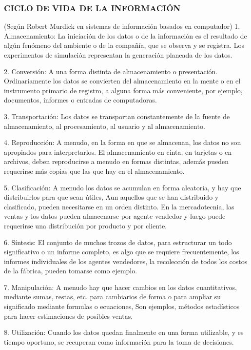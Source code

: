 \subsubsection*{CICLO DE VIDA DE LA INFORMACIÓN}
(Según Robert Murdick en sistemas de información basados en computador) 1. Almacenamiento: La iniciación de los datos o de la información es el resultado de algún fenómeno del ambiente o de la compañía, que se observa y se registra. Los experimentos de simulación representan la generación planeada de los datos.

2. Conversión: A una forma distinta de almacenamiento o presentación. Ordinariamente los datos se convierten del almacenamiento en la mente o en el instrumento primario de registro, a alguna forma más conveniente, por ejemplo, documentos, informes o entradas de computadoras.

3. Transportación: Los datos se transportan constantemente de la fuente de almacenamiento, al procesamiento, al usuario y al almacenamiento.

4. Reproducción: A menudo, en la forma en que se almacenan, los datos no son apropiados para interpretarlos. El almacenamiento en cinta, en tarjetas o en archivos, deben reproducirse a menudo en formas distintas, además pueden requerirse más copias que las que hay en el almacenamiento.

5. Clasificación: A menudo los datos se acumulan en forma aleatoria, y hay que distribuirlos para que sean útiles, Aun aquellos que se han distribuido y clasificado, pueden necesitarse en un orden distinto. En la mercadotecnia, las ventas y los datos pueden almacenarse por agente vendedor y luego puede requerirse una distribución por producto y por cliente.

6. Síntesis: El conjunto de muchos trozos de datos, para estructurar un todo significativo o un informe completo, es algo que se requiere frecuentemente, los informes individuales de los agentes vendedores, la recolección de todos los costos de la fábrica, pueden tomarse como ejemplo.

7. Manipulación: A menudo hay que hacer cambios en los datos cuantitativos, mediante sumas, restas, etc. para cambiarios de forma o para ampliar su significado mediante formulas o ecuaciones, Son ejemplos, métodos estadísticos para hacer estimaciones de posibles ventas.

8. Utilización: Cuando los datos quedan finalmente en una forma utilizable, y es tiempo oportuno, se recuperan como información para la toma de decisiones.

